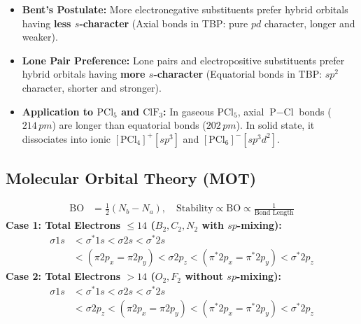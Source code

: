 \documentclass[10pt,twoside,openright]{book}
\begin{document}
\begin{usecasebox}
\begin{itemize}
  \item \textbf{Bent's Postulate:} More electronegative substituents prefer hybrid orbitals having \textbf{less $s$-character} (Axial bonds in TBP: pure $pd$ character, longer and weaker).
  \item \textbf{Lone Pair Preference:} Lone pairs and electropositive substituents prefer hybrid orbitals having \textbf{more $s$-character} (Equatorial bonds in TBP: $sp^2$ character, shorter and stronger).
  \item \textbf{Application to $\text{PCl}_5$ and $\text{ClF}_3$:} In gaseous $\text{PCl}_5$, axial $\text{P}-\text{Cl}$ bonds ($214\,\si{pm}$) are longer than equatorial bonds ($202\,\si{pm}$). In solid state, it dissociates into ionic $[\text{PCl}_4]^+ [sp^3]$ and $[\text{PCl}_6]^- [sp^3d^2]$.
\end{itemize}
\end{usecasebox}

\subsection{Molecular Orbital Theory (MOT)}

\begin{formulabox}
\begin{align}
  \text{BO} &= \frac{1}{2}(N_b - N_a), \quad \text{Stability} \propto \text{BO} \propto \frac{1}{\text{Bond Length}}
\end{align}
\textbf{Case 1: Total Electrons $\le 14$ ($B_2, C_2, N_2$ with $sp$-mixing):}
\begin{align}
  \sigma 1s &< \sigma^* 1s < \sigma 2s < \sigma^* 2s \\
  &< (\pi 2p_x = \pi 2p_y) < \sigma 2p_z < (\pi^* 2p_x = \pi^* 2p_y) < \sigma^* 2p_z
\end{align}
\textbf{Case 2: Total Electrons $> 14$ ($O_2, F_2$ without $sp$-mixing):}
\begin{align}
  \sigma 1s &< \sigma^* 1s < \sigma 2s < \sigma^* 2s \\
  &< \sigma 2p_z < (\pi 2p_x = \pi 2p_y) < (\pi^* 2p_x = \pi^* 2p_y) < \sigma^* 2p_z
\end{align}
\end{formulabox}
\end{document}
